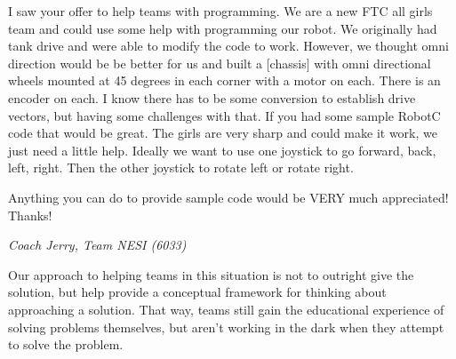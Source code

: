 \begin{fancyquotes}
I saw your offer to help teams with programming. We are a new FTC all girls team and could use some help with programming our robot. We originally had tank drive and were able to modify the code to work. However, we thought omni direction would be be better for us and built a [chassis] with omni directional wheels mounted at 45 degrees in each corner with a motor on each. There is an encoder on each. I know there has to be some conversion to establish drive vectors, but having some challenges with that. If you had some sample RobotC code that would be great. The girls are very sharp and could make it work, we just need a little help. Ideally we want to use one joystick to go forward, back, left, right. Then the other joystick to rotate left or rotate right.
 
Anything you can do to provide sample code would be VERY much appreciated! Thanks!

\textit{Coach Jerry, Team NESI (6033)}
\end{fancyquotes}

Our approach to helping teams in this situation is not to outright give the solution, but help provide a conceptual framework for thinking about approaching a solution. That way, teams still gain the educational experience of solving problems themselves, but aren't working in the dark when they attempt to solve the problem.

